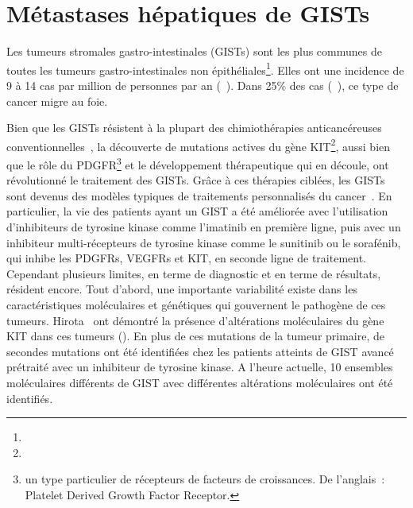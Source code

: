 \documentclass[main.tex]{subfiles}
\begin{document}
\section{Métastases hépatiques de GISTs}
Les tumeurs stromales gastro-intestinales (GISTs) sont les plus communes de toutes les tumeurs 
gastro-intestinales non épithéliales\footnote{}. Elles ont une incidence de 9 à 14 cas par million de personnes par an (\cf~\cite{Nilsson2005}). 
Dans 25\% des cas (\cf~\cite{dematteo2000}), ce type 
de cancer migre au foie. 


Bien que les GISTs résistent à la plupart des chimiothérapies anticancéreuses conventionnelles~\cite{demetri2011gastrointestinal}, 
la découverte de mutations actives du gène KIT\footnote{}, aussi bien que le rôle du PDGFR\footnote{un type particulier de récepteurs de facteurs de croissances. De l'anglais~: Platelet Derived Growth Factor Receptor.} et le développement thérapeutique qui en découle, ont révolutionné le traitement des GISTs.
Grâce à ces thérapies ciblées, les GISTs sont devenus des modèles typiques de traitements personnalisés du cancer~\cite{Blay2012}. 
En particulier, la vie des patients ayant un GIST a été améliorée avec l'utilisation d'inhibiteurs de tyrosine kinase comme l'imatinib en première ligne, puis avec un inhibiteur multi-récepteurs de tyrosine kinase comme 
le sunitinib ou le sorafénib,  
qui inhibe les PDGFRs, VEGFRs et KIT, en seconde ligne de traitement. 
Cependant plusieurs limites, en terme de diagnostic et en terme de résultats, résident encore.
Tout d'abord, une importante variabilité existe dans les caractéristiques moléculaires et génétiques qui gouvernent le pathogène de ces tumeurs.
Hirota \etal\ ont démontré la présence d'altérations moléculaires du gène KIT dans ces tumeurs (\cf \cite{Hirota1998}). 
En plus de ces mutations de la tumeur primaire, de secondes mutations ont été identifiées chez les patients atteints de GIST avancé prétraité avec un inhibiteur de tyrosine kinase. A l'heure actuelle, 10 ensembles moléculaires différents de GIST avec différentes altérations moléculaires ont été identifiés. 
\end{document}
